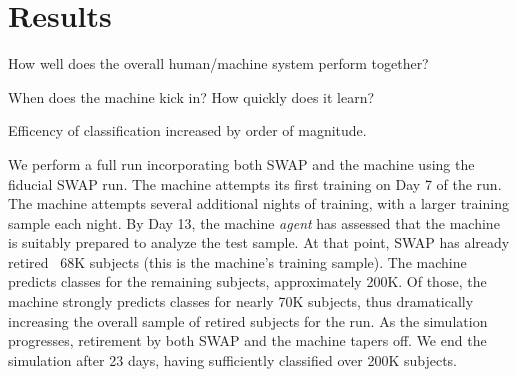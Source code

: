 \documentclass[twocolumn]{aastex6}
\begin{document}
\section{Results}
How well does the overall human/machine system perform together? 

When does the machine kick in? How quickly does it learn? 

Efficency of classification increased by order of magnitude. 

We perform a full run incorporating both SWAP and the machine using the fiducial SWAP run.
The machine attempts its first training on Day 7 of the run. The machine attempts several 
additional nights of training, with a larger training sample each night. By Day 13, 
the machine \textit{agent} has assessed that the machine is suitably prepared to 
analyze the test sample. At that point, SWAP has already retired ~68K subjects 
(this is the machine's training sample). The machine predicts classes for the remaining
subjects, approximately 200K. Of those, the machine strongly predicts classes for 
nearly 70K subjects, thus dramatically increasing the overall sample of retired 
subjects for the run. As the simulation progresses, retirement by both SWAP and
the machine tapers off. We end the simulation after 23 days, having sufficiently 
classified over 200K subjects. 
\end{document}
